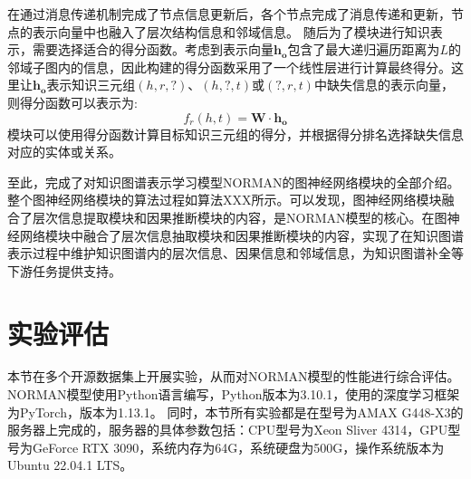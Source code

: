 \documentclass[algorithmlist, AutoFakeBold, AutoFakeSlant, figurelist, tablelist, nomlist, masters]{seuthesix}
\begin{document}
在通过消息传递机制完成了节点信息更新后，各个节点完成了消息传递和更新，节点的表示向量中也融入了层次结构信息和邻域信息。
随后为了模块进行知识表示，需要选择适合的得分函数。考虑到表示向量$\bm{h_o}$包含了最大递归遍历距离为$L$的邻域子图内的信息，因此构建的得分函数采用了一个线性层进行计算最终得分。这里让$\bm{h_o}$表示知识三元组$(h, r, ?)$、$(h, ?, t)$或$(?, r, t)$中缺失信息的表示向量，则得分函数可以表示为:
\begin{equation}
  f_{r}(h, t) = \mathbf{W} \cdot \bm{h_o}
  \label{equation_GNNScore}
\end{equation}
模块可以使用得分函数计算目标知识三元组的得分，并根据得分排名选择缺失信息对应的实体或关系。


至此，完成了对知识图谱表示学习模型NORMAN的图神经网络模块的全部介绍。整个图神经网络模块的算法过程如算法XXX所示。可以发现，图神经网络模块融合了层次信息提取模块和因果推断模块的内容，是NORMAN模型的核心。在图神经网络模块中融合了层次信息抽取模块和因果推断模块的内容，实现了在知识图谱表示过程中维护知识图谱内的层次信息、因果信息和邻域信息，为知识图谱补全等下游任务提供支持。

\section{实验评估}
本节在多个开源数据集上开展实验，从而对NORMAN模型的性能进行综合评估。
NORMAN模型使用Python语言编写，Python版本为3.10.1，使用的深度学习框架为PyTorch，版本为1.13.1。
同时，本节所有实验都是在型号为AMAX G448-X3的服务器上完成的，服务器的具体参数包括：CPU型号为Xeon Sliver 4314，GPU型号为GeForce RTX 3090，系统内存为64G，系统硬盘为500G，操作系统版本为Ubuntu 22.04.1 LTS。
\end{document}
